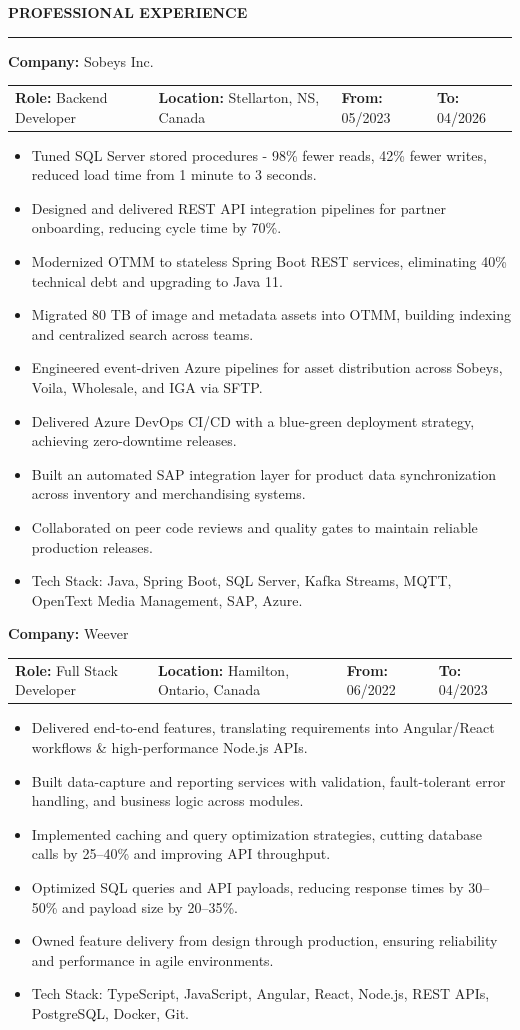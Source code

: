 \documentclass[9pt,letterpaper]{article}
\makeatletter
\newlength{\sectionrulegap}
\newlength{\sectioncontentgap}
\newcommand{\resumesection}[1]{%
  \par\vspace{\sectionrulegap}%
  \noindent\textbf{\MakeUppercase{#1}}\par
  \nointerlineskip
  \vspace{\sectionrulegap}%
  \noindent\rule{\linewidth}{0.35pt}\par
  \nointerlineskip
  \vspace{\sectionrulegap}%
}
\newcommand{\job}[5]{%
  \textbf{Company:} #1\\%
  \begin{tabularx}{\linewidth}{@{}>{\hsize=1.0\hsize\raggedright\arraybackslash}X>{\hsize=1.5\hsize\raggedright\arraybackslash}X>{\hsize=0.8\hsize\raggedright\arraybackslash}X>{\hsize=0.5\hsize\raggedright\arraybackslash}X@{}}
  \textbf{Role:} #2 &
  \textbf{Location:} #5 &
  \textbf{From:} #3 &
  \textbf{To:} #4
  \end{tabularx}\par
  \vspace{0.5pt}%
}
\makeatother
\begin{document}
\resumesection{Professional Experience}
\job{Sobeys Inc.}{Backend Developer}{05/2023}{04/2026}{Stellarton, NS, Canada}
\begin{itemize}
  \item Tuned SQL Server stored procedures - 98\% fewer reads, 42\% fewer writes, reduced load time from 1 minute to 3 seconds.
  \item Designed and delivered REST API integration pipelines for partner onboarding, reducing cycle time by 70\%.
  \item Modernized OTMM to stateless Spring Boot REST services, eliminating 40\% technical debt and upgrading to Java 11.
  \item Migrated 80 TB of image and metadata assets into OTMM, building indexing and centralized search across teams.
  \item Engineered event-driven Azure pipelines for asset distribution across Sobeys, Voila, Wholesale, and IGA via SFTP.
  \item Delivered Azure DevOps CI/CD with a blue-green deployment strategy, achieving zero-downtime releases.
  \item Built an automated SAP integration layer for product data synchronization across inventory and merchandising systems.
  \item Collaborated on peer code reviews and quality gates to maintain reliable production releases.
  \item Tech Stack: Java, Spring Boot, SQL Server, Kafka Streams, MQTT, OpenText Media Management, SAP, Azure.
\end{itemize}
\vspace{\sectioncontentgap}
\job{Weever}{Full Stack Developer}{06/2022}{04/2023}{Hamilton, Ontario, Canada}
\begin{itemize}
  \item Delivered end-to-end features, translating requirements into Angular/React workflows \& high-performance Node.js APIs.
  \item Built data-capture and reporting services with validation, fault-tolerant error handling, and business logic across modules.
  \item Implemented caching and query optimization strategies, cutting database calls by 25--40\% and improving API throughput.
  \item Optimized SQL queries and API payloads, reducing response times by 30--50\% and payload size by 20--35\%.
  \item Owned feature delivery from design through production, ensuring reliability and performance in agile environments.
  \item Tech Stack: TypeScript, JavaScript, Angular, React, Node.js, REST APIs, PostgreSQL, Docker, Git.
\end{itemize}
\vspace{\sectioncontentgap}
\end{document}
